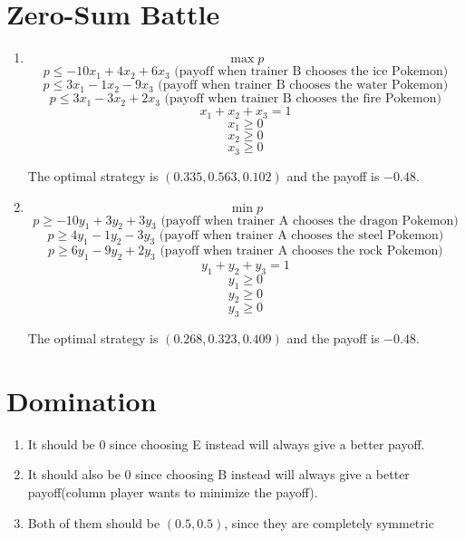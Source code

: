 \documentclass[11pt]{article}
\newenvironment{qparts}{\begin{enumerate}[{(}a{)}]}{\end{enumerate}}
\begin{document}
\newpage
\section{Zero-Sum Battle}
\begin{qparts}
	
	\item 
	
	\[
		\max p
	\]
	\[
		p \le -10x_1 +4x_2 + 6x_3 \text{ (payoff when trainer B chooses the ice Pokemon)}
	\]
	\[
		p \le 3x_1 -1x_2 - 9x_3 \text{ (payoff when trainer B chooses the water Pokemon)}
	\]
	\[
		p \le 3x_1 -3x_2 + 2x_3 \text{ (payoff when trainer B chooses the fire Pokemon)}
	\]
	\[
		x_1 + x_2 + x_3 = 1
	\]
	\[
		x_1 \ge 0
	\]
	\[
		x_2 \ge 0
	\]
	\[
		x_3 \ge 0
	\]
	
	The optimal strategy is $(0.335, 0.563, 0.102)$ and the payoff is $-0.48$.
		
	\item 
	
	\[
		\min p
	\]
	\[
		p \ge -10y_1 + 3y_2 + 3y_3 \text{ (payoff when trainer A chooses the dragon Pokemon)}
	\]
	\[
		p \ge 4y_1 -1y_2 - 3y_3 \text{ (payoff when trainer A chooses the steel Pokemon)}
	\]
	\[
		p \ge 6y_1 -9y_2 + 2y_3 \text{ (payoff when trainer A chooses the rock Pokemon)}
	\]
	\[
		y_1 + y_2 + y_3 = 1
	\]
	\[
		y_1 \ge 0
	\]
	\[
		y_2 \ge 0
	\]
	\[
		y_3 \ge 0
	\]
	
	The optimal strategy is $(0.268, 0.323, 0.409)$ and the payoff is $-0.48$.

\end{qparts}



\newpage
\section{Domination}
\begin{qparts}
	\item 
	
	It should be 0 since choosing E instead will always give a better payoff.
	
	\item
	
	It should also be 0 since choosing B instead will always give a better payoff(column player wants to minimize the payoff).
	
	\item
	
	Both of them should be $(0.5, 0.5)$, since they are completely symmetric
	
\end{qparts}
\end{document}
